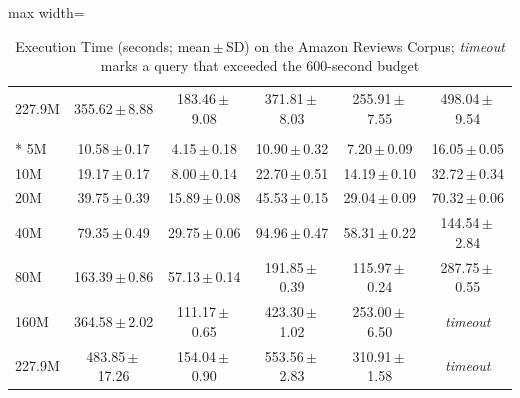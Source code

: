 \documentclass[preprint,12pt,times,a4paper]{elsarticle}
\begin{document}
\begin{table}[H]
\begin{adjustbox}{max width=\textwidth}
\begin{tabular}{@{}lccccc@{}}
227.9M & 355.62\,$\pm$\,8.88 & 183.46\,$\pm$\,9.08 & 371.81\,$\pm$\,8.03 & 255.91\,$\pm$\,7.55 & 498.04\,$\pm$\,9.54 \\
\addlinespace[3pt]
\multicolumn{6}{@{}l}{\textit{Trino~473 (disk connector)}}\\*
5M & 10.58\,$\pm$\,0.17 & 4.15\,$\pm$\,0.18 & 10.90\,$\pm$\,0.32 & 7.20\,$\pm$\,0.09 & 16.05\,$\pm$\,0.05 \\
10M & 19.17\,$\pm$\,0.17 & 8.00\,$\pm$\,0.14 & 22.70\,$\pm$\,0.51 & 14.19\,$\pm$\,0.10 & 32.72\,$\pm$\,0.34 \\
20M & 39.75\,$\pm$\,0.39 & 15.89\,$\pm$\,0.08 & 45.53\,$\pm$\,0.15 & 29.04\,$\pm$\,0.09 & 70.32\,$\pm$\,0.06 \\
40M & 79.35\,$\pm$\,0.49 & 29.75\,$\pm$\,0.06 & 94.96\,$\pm$\,0.47 & 58.31\,$\pm$\,0.22 & 144.54\,$\pm$\,2.84 \\
80M & 163.39\,$\pm$\,0.86 & 57.13\,$\pm$\,0.14 & 191.85\,$\pm$\,0.39 & 115.97\,$\pm$\,0.24 & 287.75\,$\pm$\,0.55 \\
160M & 364.58\,$\pm$\,2.02 & 111.17\,$\pm$\,0.65 & 423.30\,$\pm$\,1.02 & 253.00\,$\pm$\,6.50 & \textit{timeout} \\
227.9M & 483.85\,$\pm$\,17.26 & 154.04\,$\pm$\,0.90 & 553.56\,$\pm$\,2.83 & 310.91\,$\pm$\,1.58 & \textit{timeout} \\
\bottomrule
\end{tabular}
\end{adjustbox}
\caption{Execution Time (seconds; mean\,$\pm$\,SD) on the Amazon Reviews Corpus; \textit{timeout} marks a query that exceeded the 600-second budget}
\label{tab:stress_volume}
\end{table}
\end{document}
